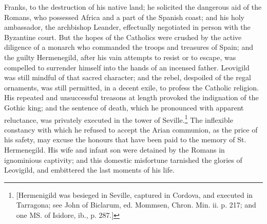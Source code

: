 Franks, to the destruction of his native land; he solicited the dangerous aid of the Romans, who possessed Africa and a part of the Spanish coast; and his holy ambassador, the archbishop Leander, effectually negotiated in person with the Byzantine court. But the hopes of the Catholics were crushed by the active diligence of a monarch who commanded the troops and treasures of Spain; and the guilty Hermenegild, after his vain attempts to resist or to escape, was compelled to surrender himself into the hands of an incensed father. Leovigild was still mindful of that sacred character; and the rebel, despoiled of the regal ornaments, was still permitted, in a decent exile, to profess the Catholic religion. His repeated and unsuccessful treasons at length provoked the indignation of the Gothic king; and the sentence of death, which he pronounced with apparent reluctance, was privately executed in the tower of Seville.\footnote{[Hermenigild was besieged in Seville, captured in Cordova, and executed in Tarragona; see John of Biclarum, ed. Mommsen, Chron. Min. ii. p. 217; and one MS. of Isidore, ib., p. 287.]} The inflexible constancy with which he refused to accept the Arian communion, as the price of his safety, may excuse the honours that have been paid to the memory of St. Hermenegild. His wife and infant son were detained by the Romans in ignominious captivity; and this domestic misfortune tarnished the glories of Leovigild, and embittered the last moments of his life.

